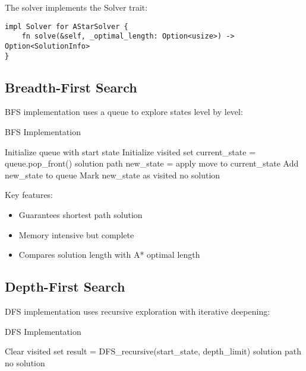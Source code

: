 \documentclass[a4paper]{article}
\begin{document}
The solver implements the Solver trait:
\begin{lstlisting}[style=rustcode]
impl Solver for AStarSolver {
    fn solve(&self, _optimal_length: Option<usize>) -> Option<SolutionInfo>
}
\end{lstlisting}

\subsection{Breadth-First Search}
BFS implementation uses a queue to explore states level by level:

\begin{algorithm}
\caption{BFS Implementation}
\begin{algorithmic}[1]
\State Initialize queue with start state
\State Initialize visited set
    \State current\_state = queue.pop\_front()
        \Return solution path
    \EndIf
        \State new\_state = apply move to current\_state
            \State Add new\_state to queue
            \State Mark new\_state as visited
        \EndIf
    \EndFor
\EndWhile
\Return no solution
\end{algorithmic}
\end{algorithm}

Key features:
\begin{itemize}
    \item Guarantees shortest path solution
    \item Memory intensive but complete
    \item Compares solution length with A* optimal length
\end{itemize}

\subsection{Depth-First Search}
DFS implementation uses recursive exploration with iterative deepening:

\begin{algorithm}
\caption{DFS Implementation}
\begin{algorithmic}[1]
    \State Clear visited set
    \State result = DFS\_recursive(start\_state, depth\_limit)
        \Return solution path
    \EndIf
\EndFor
\Return no solution
\end{algorithmic}
\end{algorithm}
\end{document}

